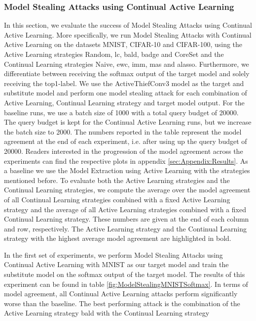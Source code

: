 \subsubsection{Model Stealing Attacks using Continual Active Learning}
\label{sec:Evaluation:Results:MS:CAL}

In this section, we evaluate the success of Model Stealing Attacks using Continual Active Learning. More specifically, we run Model Stealing Attacks with Continual Active Learning on the datasets MNIST, CIFAR-10 and CIFAR-100, using the Active Learning strategies
Random, \gls{lc}, \gls{bald}, \gls{badge} and CoreSet and the Continual Learning strategies Naive, \gls{ewc}, \gls{imm}, \gls{mas} and \gls{alasso}. Furthermore, we differentiate between receiving the softmax output of the target model and solely receiving the top1-label. We use the ActiveThiefConv3 model
as the target and substitute model and perform one model stealing attack for each combination of Active Learning, Continual Learning strategy and target model output. For the baseline runs, we use a batch size of 1000 with a total query budget of 20000. The query budget
is kept for the Continual Active Learning runs, but we increase the batch size to 2000. The numbers reported in the table represent the model agreement at the end of each experiment, i.e. after using up the query budget of 20000. Readers interested in the progression of the
model agreement across the experiments can find the respective plots in appendix \ref{sec:Appendix:Results}. As a baseline we use the Model Extraction using Active Learning with the strategies mentioned before. To evaluate both the Active Learning strategies and the Continual
Learning strategies, we compute the average over the model agreement of all Continual Learning strategies combined with a fixed Active Learning strategy and the average of all Active Learning strategies combined with a fixed Continual Learning strategy. These numbers are given
at the end of each column and row, respectively. The Active Learning strategy and the Continual Learning strategy with the highest average model agreement are highlighted in bold. \par
In the first set of experiments, we perform Model Stealing Attacks using Continual Active Learning with MNIST as our target model and train the substitute model on the softmax output of the target model. The results of this experiment can be found in table
\ref{fig:ModelStealingMNISTSoftmax}. In terms of model agreement, all Continual Active Learning attacks perform significantly worse than the baseline. The best performing attack is the combination of the Active Learning strategy \gls{bald} with the Continual Learning strategy
